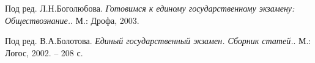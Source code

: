 \begin{thebibliography}{9}

Под ред. Л.Н.Боголюбова.
\textit{Готовимся к единому государственному экзамену: Обществознание.}.
М.: Дрофа, 2003.

Под ред. В.А.Болотова.
\textit{Единый государственный экзамен. Сборник статей.}.
М.: Логос, 2002. – 208 с.
\end{thebibliography}
